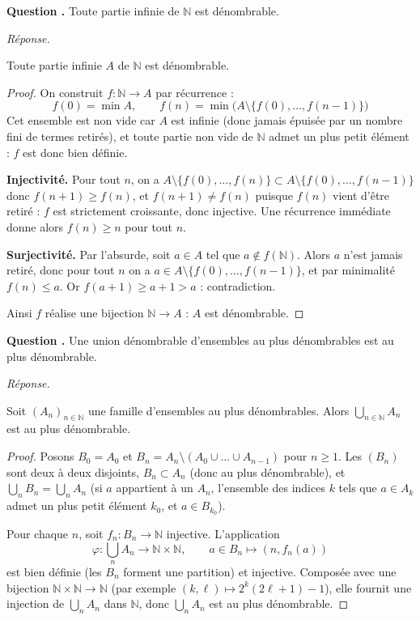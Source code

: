 \documentclass[11pt]{article}
\newcounter{qnum}
\newcommand{\question}[1]{%
\stepcounter{qnum}%
\bigskip
\noindent\textbf{Question \theqnum.} #1\par}
\newcommand{\reponse}{\noindent\textit{Réponse.}\ }
\begin{document}
\question{Toute partie infinie de $\mathbb{N}$ est dénombrable.}
\reponse
\begin{prop}
Toute partie infinie $A$ de $\mathbb{N}$ est dénombrable.
\end{prop}

\begin{proof}
On construit $f:\mathbb{N}\to A$ par récurrence :
\[f(0)=\min A, \qquad f(n) = \min\big(A\setminus\{f(0),\dots,f(n-1)\}\big)\]
Cet ensemble est non vide car $A$ est infinie (donc jamais épuisée par un nombre fini de termes retirés), et toute partie non vide de $\mathbb{N}$ admet un plus petit élément : $f$ est donc bien définie.

\textbf{Injectivité.} Pour tout $n$, on a $A\setminus\{f(0),\dots,f(n)\}\subset A\setminus\{f(0),\dots,f(n-1)\}$ donc $f(n+1)\geq f(n)$, et $f(n+1)\neq f(n)$ puisque $f(n)$ vient d'être retiré : $f$ est strictement croissante, donc injective. Une récurrence immédiate donne alors $f(n)\geq n$ pour tout $n$.

\textbf{Surjectivité.} Par l'absurde, soit $a\in A$ tel que $a\notin f(\mathbb{N})$. Alors $a$ n'est jamais retiré, donc pour tout $n$ on a $a\in A\setminus\{f(0),\dots,f(n-1)\}$, et par minimalité $f(n)\leq a$. Or $f(a+1)\geq a+1>a$ : contradiction.

Ainsi $f$ réalise une bijection $\mathbb{N}\to A$ : $A$ est dénombrable.
\end{proof}

\question{Une union dénombrable d'ensembles au plus dénombrables est au plus dénombrable.}
\reponse
\begin{prop}
Soit $(A_n)_{n\in\mathbb{N}}$ une famille d'ensembles au plus dénombrables. Alors $\displaystyle\bigcup_{n\in\mathbb{N}} A_n$ est au plus dénombrable.
\end{prop}

\begin{proof}
Posons $B_0=A_0$ et $B_n=A_n\setminus(A_0\cup\dots\cup A_{n-1})$ pour $n\geq 1$. Les $(B_n)$ sont deux à deux disjoints, $B_n\subset A_n$ (donc au plus dénombrable), et $\bigcup_n B_n=\bigcup_n A_n$ (si $a$ appartient à un $A_n$, l'ensemble des indices $k$ tels que $a\in A_k$ admet un plus petit élément $k_0$, et $a\in B_{k_0}$).

Pour chaque $n$, soit $f_n:B_n\to\mathbb{N}$ injective. L'application
\[\varphi:\bigcup_n A_n \to \mathbb{N}\times\mathbb{N}, \qquad a\in B_n\mapsto (n,f_n(a))\]
est bien définie (les $B_n$ forment une partition) et injective. Composée avec une bijection $\mathbb{N}\times\mathbb{N}\to\mathbb{N}$ (par exemple $(k,\ell)\mapsto 2^k(2\ell+1)-1$), elle fournit une injection de $\bigcup_n A_n$ dans $\mathbb{N}$, donc $\bigcup_n A_n$ est au plus dénombrable.
\end{proof}
\end{document}
